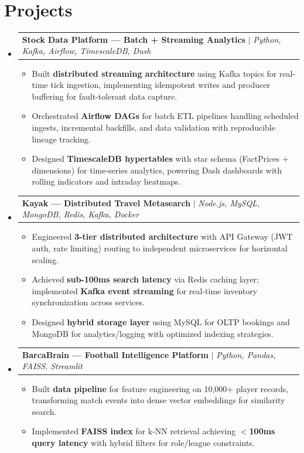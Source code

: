 \documentclass[letterpaper,10pt]{article}
\makeatletter
\newcommand{\resumeItem}[1]{
  \item\small{#1 \vspace{-3pt}}
}
\newcommand{\resumeProjectHeading}[2]{
    \item
    \begin{tabular*}{0.97\textwidth}{l@{\extracolsep{\fill}}r}
      \small#1 & #2 \\
    \end{tabular*}\vspace{-8pt}
}
\newcommand{\resumeSubHeadingListStart}{\begin{itemize}[leftmargin=0.12in, label={}]}
\newcommand{\resumeSubHeadingListEnd}{\end{itemize}}
\newcommand{\resumeItemListStart}{\begin{itemize}[leftmargin=0.15in]}
\newcommand{\resumeItemListEnd}{\end{itemize}\vspace{-6pt}}
\makeatother
\begin{document}
\section{Projects}
    \resumeSubHeadingListStart
      \resumeProjectHeading
          {\textbf{Stock Data Platform --- Batch + Streaming Analytics} $|$ \emph{Python, Kafka, Airflow, TimescaleDB, Dash}}{}
          \resumeItemListStart
            \resumeItem{Built \textbf{distributed streaming architecture} using Kafka topics for real-time tick ingestion, implementing idempotent writes and producer buffering for fault-tolerant data capture.}
            \resumeItem{Orchestrated \textbf{Airflow DAGs} for batch ETL pipelines handling scheduled ingests, incremental backfills, and data validation with reproducible lineage tracking.}
            \resumeItem{Designed \textbf{TimescaleDB hypertables} with star schema (FactPrices + dimensions) for time-series analytics, powering Dash dashboards with rolling indicators and intraday heatmaps.}
          \resumeItemListEnd
      \resumeProjectHeading
          {\textbf{Kayak --- Distributed Travel Metasearch} $|$ \emph{Node.js, MySQL, MongoDB, Redis, Kafka, Docker}}{}
          \resumeItemListStart
            \resumeItem{Engineered \textbf{3-tier distributed architecture} with API Gateway (JWT auth, rate limiting) routing to independent microservices for horizontal scaling.}
            \resumeItem{Achieved \textbf{sub-100ms search latency} via Redis caching layer; implemented \textbf{Kafka event streaming} for real-time inventory synchronization across services.}
            \resumeItem{Designed \textbf{hybrid storage layer} using MySQL for OLTP bookings and MongoDB for analytics/logging with optimized indexing strategies.}
          \resumeItemListEnd
      \resumeProjectHeading
          {\textbf{BarcaBrain --- Football Intelligence Platform} $|$ \emph{Python, Pandas, FAISS, Streamlit}}{}
          \resumeItemListStart
            \resumeItem{Built \textbf{data pipeline} for feature engineering on 10,000+ player records, transforming match events into dense vector embeddings for similarity search.}
            \resumeItem{Implemented \textbf{FAISS index} for k-NN retrieval achieving \textbf{$<$100ms query latency} with hybrid filters for role/league constraints.}
          \resumeItemListEnd
    \resumeSubHeadingListEnd

\end{document}
